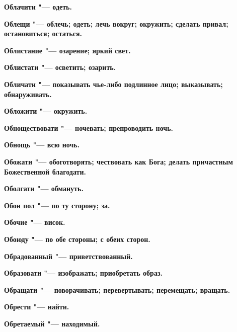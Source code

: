 \bfseries Облачити \normalfont{} "--- одеть. 




\bfseries Облещи \normalfont{} "--- облечь; одеть; лечь вокруг; окружить; сделать привал; остановиться; остаться. 




\bfseries Облистание \normalfont{} "--- озарение; яркий свет. 




\bfseries Облистати \normalfont{} "--- осветить; озарить. 




\bfseries Обличати \normalfont{} "--- показывать чье-либо подлинное лицо; выказывать; обнаруживать. 




\bfseries Обложити \normalfont{} "--- окружить. 




\bfseries Обноществовати \normalfont{} "--- ночевать; препроводить ночь. 




\bfseries Обнощь \normalfont{} "--- всю ночь. 




\bfseries Обожати \normalfont{} "--- обоготворять; чествовать как Бога; делать причастным Божественной благодати. 




\bfseries Оболгати \normalfont{} "--- обмануть. 




\bfseries Обон пол \normalfont{} "--- по ту сторону; за. 




\bfseries Обочие \normalfont{} "--- висок. 




\bfseries Обоюду \normalfont{} "--- по обе стороны; с обеих сторон. 




\bfseries Обрадованный \normalfont{} "--- приветствованный. 




\bfseries Образовати \normalfont{} "--- изображать; приобретать образ. 




\bfseries Обращати \normalfont{} "--- поворачивать; перевертывать; перемещать; вращать. 




\bfseries Обрести \normalfont{} "--- найти. 




\bfseries Обретаемый \normalfont{} "--- находимый. 




